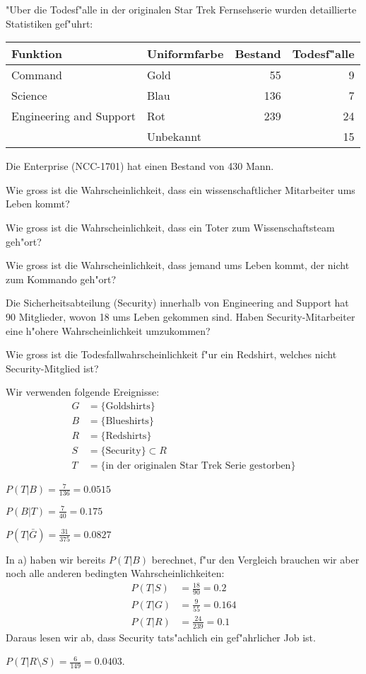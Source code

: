 "Uber die Todesf"alle in der originalen Star Trek Fernsehserie wurden
detaillierte Statistiken gef"uhrt:
\begin{center}
\begin{tabular}{|l|l|r|r|}
\hline
Funktion&Uniformfarbe&Bestand&Todesf"alle\\
\hline
Command&Gold&55&9\\
Science&Blau&136&7\\
Engineering and Support&Rot&239&24\\
&Unbekannt&&15\\
\hline
\end{tabular}
\end{center}
Die Enterprise (NCC-1701) hat einen Bestand von 430 Mann.
\begin{teilaufgaben}
\item
Wie gross ist die Wahrscheinlichkeit, dass ein wissenschaftlicher Mitarbeiter
ums Leben kommt?
\item
Wie gross ist die Wahrscheinlichkeit, dass ein Toter zum Wissenschaftsteam
geh"ort?
\item
Wie gross ist die Wahrscheinlichkeit, dass jemand ums Leben kommt, der
nicht zum Kommando geh"ort?
\item 
Die Sicherheitsabteilung (Security) innerhalb von Engineering and Support
hat 90 Mitglieder, wovon 18 ums Leben gekommen sind.
Haben Security-Mitarbeiter eine h"ohere Wahrscheinlichkeit umzukommen?
\item
Wie gross ist die Todesfallwahrscheinlichkeit f"ur ein Redshirt, welches
nicht Security-Mitglied ist?
\end{teilaufgaben}

\begin{loesung}
Wir verwenden folgende Ereignisse:
\begin{align*}
G&=\{\text{Goldshirts}\}\\
B&=\{\text{Blueshirts}\}\\
R&=\{\text{Redshirts}\}\\
S&=\{\text{Security}\}\subset R\\
T&=\{\text{in der originalen Star Trek Serie gestorben}\}
\end{align*}
\begin{teilaufgaben}
\item
$
P(T|B)=\frac{7}{136}=0.0515
$
\item
$
P(B|T)=\frac{7}{40}=0.175
$
\item
$
P(T|\bar G)=\frac{31}{375}=0.0827
$
\item
In a) haben wir bereits $P(T|B)$ berechnet, f"ur den Vergleich
brauchen wir aber noch alle anderen bedingten Wahrscheinlichkeiten:
\begin{align*}
P(T|S)&=\frac{18}{90}=0.2
\\
P(T|G)&=\frac{9}{55}=0.164
\\
P(T|R)&=\frac{24}{239}=0.1
\end{align*}
Daraus lesen wir ab, dass Security tats"achlich ein gef"ahrlicher
Job ist.
\item
$P(T|R\setminus S)=\frac{6}{149}=0.0403$.
\end{teilaufgaben}
\end{loesung}

